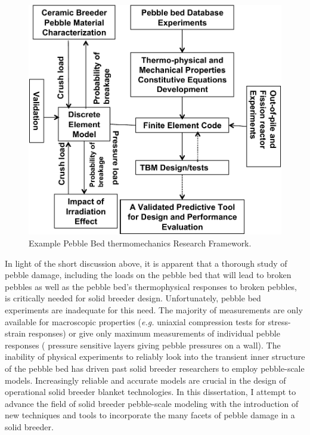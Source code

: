 \begin{figure}[t!]
	\centering
	\includegraphics[width=\singleimagewidth]{chapters/figures/Fig-11}
	\caption{Example Pebble Bed thermomechanics Research Framework.}
	\label{fig:framework}
\end{figure}

In light of the short discussion above, it is apparent that a thorough study of pebble damage, including the loads on the pebble bed that will lead to broken pebbles as well as the pebble bed's thermophysical responses to broken pebbles, is critically needed for solid breeder design. Unfortunately, pebble bed experiments are inadequate for this need. The majority of measurements are only available for macroscopic properties (\textit{e.g.} uniaxial compression tests for stress-strain responses) or give only maximum measurements of individual pebble responses ( pressure sensitive layers giving pebble pressures on a wall). The inability of physical experiments to reliably look into the transient inner structure of the pebble bed has driven past solid breeder researchers to employ pebble-scale models. Increasingly reliable and accurate models are crucial in the design of operational solid breeder blanket technologies. In this dissertation, I attempt to advance the field of solid breeder pebble-scale modeling with the introduction of new techniques and tools to incorporate the many facets of pebble damage in a solid breeder.



